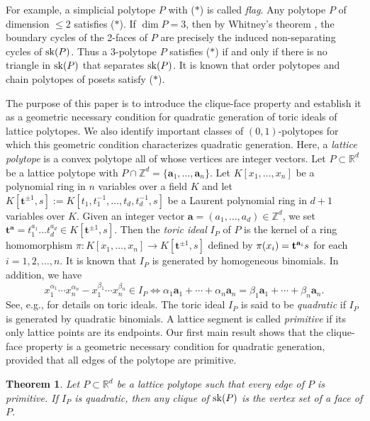 \documentclass[12pt]{amsart}
\newtheorem{thm}{Theorem} [section]
\theoremstyle{definition}
\numberwithin{thm}{section}
\numberwithin{equation}{section}
\def\NZQ{\mathbb}               %
\def\ZZ{{\NZQ Z}}
\def\RR{{\NZQ R}}
\def\ab{{\mathbf a}}
\def\tb{{\mathbf t}}
\begin{document}
For example, a simplicial polytope $P$ with ($*$) is called {\it flag}.
Any polytope $P$ of dimension $\le 2$ satisfies ($*$).
If \(\dim P=3\), then by Whitney's theorem \cite{W}, the boundary cycles of the
2-faces of \(P\) are precisely the induced non-separating cycles of
\({\rm sk}(P)\). 
%
Thus a 3-polytope $P$ satisfies ($*$)
if and only if
there is no triangle in ${\rm sk}(P)$ that separates ${\rm sk}(P)$.
It is known \cite{Mor} that order polytopes and chain polytopes of posets satisfy ($*$).

The purpose of this paper is to introduce the clique-face property and establish it as a geometric necessary condition for quadratic generation of toric ideals of lattice polytopes. We also identify important classes of \((0,1)\)-polytopes for which this geometric condition characterizes quadratic generation.
Here, a \textit{lattice polytope} is a convex polytope
all of whose vertices are integer vectors.
Let $P \subset \RR^d$ be a lattice polytope with $P \cap \ZZ^d = \{\ab_1,\ldots,\ab_n\}$.
%
Let $K[x_1,\dots, x_n]$ be a polynomial ring in $n$ variables over a field $K$
and let $K[\tb^{\pm 1},s]:= K[t_1,t_1^{-1} ,\dots, t_d, t_d^{-1}, s ]$ be a Laurent polynomial ring
in $d+1$ variables over $K$.
Given an integer vector $\ab=(a_1,\dots,a_d) \in \ZZ^d$, 
we set $\tb^\ab=t_1^{a_1} \dots t_d^{a_d} \in K[\tb^{\pm 1},s]$.
%
Then the \textit{toric ideal} $I_P$ of $P$ is the kernel of 
a ring homomorphism $\pi : K[x_1,\dots, x_n] \rightarrow K[\tb^{\pm 1},s]$ defined by $\pi(x_i) = {\bf t}^{\ab_i} s$ for each $i= 1,2,\dots,n$.
It is known that $I_P$ is generated by homogeneous binomials.
In addition, we have
\begin{equation} \label{basicIP}
    x_1^{\alpha_1} \cdots x_n^{\alpha_n} 
-
x_1^{\beta_1} \cdots x_n^{\beta_n} \in I_P
\iff
\alpha_1 \ab_1 + \cdots + \alpha_n \ab_n
=
\beta_1 \ab_1 + \cdots + \beta_n \ab_n.
\end{equation}
See, e.g., \cite{HHO} for details on toric ideals.
The toric ideal $I_P$ is said to be {\it quadratic}
if $I_P$ is generated by quadratic binomials.
A lattice segment is called \textit{primitive} if its only lattice points are its endpoints.
Our first main result shows that the clique-face property is a geometric necessary condition for quadratic generation, provided that all edges of the polytope are primitive.
\begin{thm}
\label{quadGENE}
Let $P \subset \RR^d$ be a lattice polytope
such that every edge of $P$ is primitive.
If $I_P$ is quadratic,
    then any clique of ${\rm sk}(P)$ is the vertex set of a face of $P$.
\end{thm}
\end{document}
